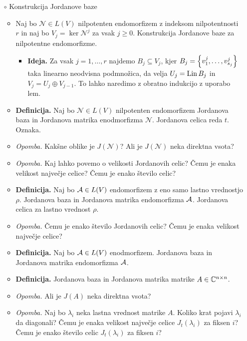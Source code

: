 \begin{enumerate}
    \item[$\circ$] Konstrukcija Jordanove baze
    \begin{itemize}
        \item Naj bo $\mathcal{N} \in L(V)$ nilpotenten endomorfizem z indeksom nilpotentnosti $r$ in naj bo $V_j = \ker \mathcal{N}^j$ za vsak $j \geq 0$.  Konstrukcija Jordanove baze za nilpotentne endomorfizme. 
        \begin{itemize}
            \item \colorbox{green!30}{\textbf{Ideja.}} Za vsak $j = 1, \ldots, r$ najdemo $B_j \subseteq V_j$, kjer $B_j = \left\{v_1^{j}, \ldots, v_{s_j}^j\right\}$ taka linearno neodvisna podmnožica, da velja $U_j = \operatorname{Lin} B_j$ in $V_j = U_j \oplus V_{j-1}$. To lahko naredimo z obratno indukcijo z uporabo lem.
        \end{itemize} 
        \item \colorbox{purple!30}{\textbf{Definicija.}} Naj bo $\mathcal{N} \in L(V)$ nilpotenten endomorfizem Jordanova baza in Jordanova matrika enodmorfizma $\mathcal{N}$. Jordanova celica reda $t$. Oznaka.
        \item \colorbox{yellow!30}{\emph{Opomba.}} Kakšne oblike je $J(\mathcal{N})$? Ali je $J(\mathcal{N})$ neka direktna vsota? 
        \item \colorbox{yellow!30}{\emph{Opomba.}} Kaj lahko povemo o velikosti Jordanovih celic? Čemu je enaka velikost največje celice? Čemu je enako število celic?
        \item \colorbox{purple!30}{\textbf{Definicija.}} Naj bo $\mathcal{A} \in L(V)$ endomorfizem z eno samo lastno vrednostjo $\rho$. Jordanova baza in Jordanova matrika endomorfizma $\mathcal{A}$. Jordanova celica za lastno vrednost $\rho$.
        \item \colorbox{yellow!30}{\emph{Opomba.}} Čemu je enako število Jordanovih celic? Čemu je enaka velikost največje celice?
        \item \colorbox{purple!30}{\textbf{Definicija.}} Naj bo $\mathcal{A} \in L(V)$ enodmorfizem. Jordanova baza in Jordanova matrika endomorfizma $\mathcal{A}$.
        \item \colorbox{purple!30}{\textbf{Definicija.}} Jordanova baza in Jordanova matrika matrike $A \in \mathbb{C}^{n \times n}$.
        \item \colorbox{yellow!30}{\emph{Opomba.}} Ali je $J(A)$ neka direktna vsota?
        \item \colorbox{yellow!30}{\emph{Opomba.}} Naj bo $\lambda_i$ neka lastna vrednost matrike $A$. Koliko krat pojavi $\lambda_i$ da diagonali? Čemu je enaka velikost največje celice $J_t(\lambda_i)$ za fiksen $i$? Čemu je enako število celic $J_t(\lambda_i)$ za fiksen $i$?

\end{itemize}
\end{enumerate}
